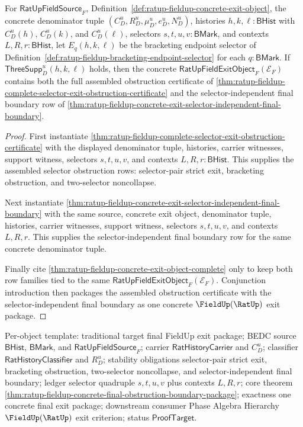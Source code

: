 \begin{theorem}
\label{thm:ratup-fieldup-concrete-final-obstruction-boundary-package}
For $\mathsf{RatUpFieldSource}_F$, Definition~\ref{def:ratup-fieldup-concrete-exit-object},
the concrete denominator tuple $(C_D^u,R_D^u,\mu_D^u,e_D^u,N_D^u)$, histories
$h,k,\ell:\mathsf{BHist}$ with $C_D^u(h)$, $C_D^u(k)$, and $C_D^u(\ell)$,
selectors $s,t,u,v:\mathsf{BMark}$, and contexts $L,R,r:\mathsf{BHist}$, let
$E_q(h,k,\ell)$ be the bracketing endpoint selector of
Definition~\ref{def:ratup-fieldup-bracketing-endpoint-selector} for each
$q:\mathsf{BMark}$. If $\mathsf{ThreeSupp}_D^u(h,k,\ell)$ holds, then the
concrete $\mathsf{RatUpFieldExitObject}_F(\mathcal E_F)$ contains both the full
assembled obstruction certificate of
\autoref{thm:ratup-fieldup-complete-selector-exit-obstruction-certificate} and
the selector-independent final boundary row of
\autoref{thm:ratup-fieldup-concrete-exit-selector-independent-final-boundary}.
\end{theorem}
\begin{proof}
First instantiate
\autoref{thm:ratup-fieldup-complete-selector-exit-obstruction-certificate} with
the displayed denominator tuple, histories, carrier witnesses, support witness,
selectors $s,t,u,v$, and contexts $L,R,r:\mathsf{BHist}$. This supplies the
assembled selector obstruction rows: selector-pair strict exit, bracketing
obstruction, and two-selector noncollapse.

Next instantiate
\autoref{thm:ratup-fieldup-concrete-exit-selector-independent-final-boundary}
with the same source, concrete exit object, denominator tuple, histories, carrier
witnesses, support witness, selectors $s,t,u,v$, and contexts $L,R,r$. This
supplies the selector-independent final boundary row for the same concrete
denominator tuple.

Finally cite \autoref{thm:ratup-fieldup-concrete-exit-object-complete} only to
keep both row families tied to the same
$\mathsf{RatUpFieldExitObject}_F(\mathcal E_F)$. Conjunction introduction then
packages the assembled obstruction certificate with the selector-independent
final boundary as one concrete $\FieldUp(\RatUp)$ exit package.
\end{proof}

Per-object template: traditional target final FieldUp exit package; BEDC source
$\mathsf{BHist}$, $\mathsf{BMark}$, and $\mathsf{RatUpFieldSource}_F$; carrier
$\mathsf{RatHistoryCarrier}$ and $C_D^u$; classifier
$\mathsf{RatHistoryClassifier}$ and $R_D^u$; stability obligations selector-pair
strict exit, bracketing obstruction, two-selector noncollapse, and
selector-independent final boundary; ledger selector quadruple $s,t,u,v$ plus
contexts $L,R,r$; core theorem
\autoref{thm:ratup-fieldup-concrete-final-obstruction-boundary-package};
exactness one concrete final exit package; downstream consumer Phase Algebra
Hierarchy $\FieldUp(\RatUp)$ exit criterion; status $\mathsf{ProofTarget}$.

